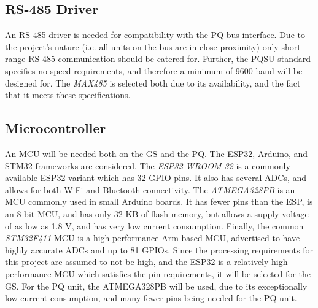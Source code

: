\subsection{RS-485 Driver}
An RS-485 driver is needed for compatibility with the PQ bus interface. Due to the project's nature (i.e. all units on the bus are in close proximity) only short-range RS-485 communication should be catered for. Further, the PQSU standard specifies no speed requirements, and therefore a minimum of 9600 baud will be designed for. The \textit{MAX485} is selected both due to its availability, and the fact that it meets these specifications.

\subsection{Microcontroller}
An MCU will be needed both on the GS and the PQ. The ESP32, Arduino, and STM32 frameworks are considered. The \textit{ESP32-WROOM-32} is a commonly available ESP32 variant which has 32 GPIO pins. It also has several ADCs, and allows for both WiFi and Bluetooth connectivity. The \textit{ATMEGA328PB} is an MCU commonly used in small Arduino boards. It has fewer pins than the ESP, is an 8-bit MCU, and has only 32 KB of flash memory, but allows a supply voltage of as low as 1.8 V, and has very low current consumption. Finally, the common \textit{STM32F411} MCU is a high-performance Arm-based MCU, advertised to have highly accurate ADCs and up to 81 GPIOs. Since the processing requirements for this project are assumed to not be high, and the ESP32 is a relatively high-performance MCU which satisfies the pin requirements, it will be selected for the GS. For the PQ unit, the ATMEGA328PB will be used, due to its exceptionally low current consumption, and many fewer pins being needed for the PQ unit.

